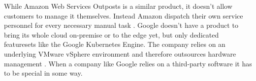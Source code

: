 \newline
While Amazon Web Services Outposts is a similar product, it doesn't allow customers to manage it themselves. Instead Amazon dispatch their own service personnel for every necessary manual task \cite{aws_outposts} \cite{aws_outposts_faq}.
\newline
Google doesn't have a product to bring its whole cloud on-premise or to the edge yet, but only dedicated featuresets like the Google Kubernetes Engine. The company relies on an underlying VMware vSphere environment and therefore outsources hardware management \cite{google_anthos_onprem}.
\newline
When a company like Google relies on a third-party software it has to be special in some way.


